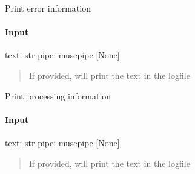 \documentclass[letterpaper,10pt,english]{sphinxmanual}
\begin{document}

\begin{fulllineitems}
\label{\detokenize{api/pymusepipe:pymusepipe.util_pipe.print_error}}
\pysigstartsignatures
{}
\pysigstopsignatures
\sphinxAtStartPar
Print error information


\paragraph{Input}
\label{\detokenize{api/pymusepipe:id174}}
\sphinxAtStartPar
text: str
pipe: musepipe {[}None{]}
\begin{quote}

\sphinxAtStartPar
If provided, will print the text in the logfile
\end{quote}

\end{fulllineitems}


\begin{fulllineitems}
\label{\detokenize{api/pymusepipe:pymusepipe.util_pipe.print_info}}
\pysigstartsignatures
{}
\pysigstopsignatures
\sphinxAtStartPar
Print processing information


\paragraph{Input}
\label{\detokenize{api/pymusepipe:id175}}
\sphinxAtStartPar
text: str
pipe: musepipe {[}None{]}
\begin{quote}

\sphinxAtStartPar
If provided, will print the text in the logfile
\end{quote}

\end{fulllineitems}

\end{document}
